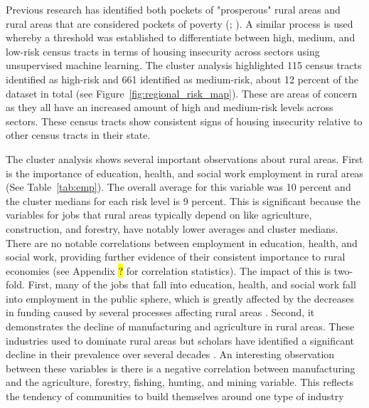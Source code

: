 Previous research has identified both pockets of "prosperous" rural areas and rural areas that are considered pockets of poverty (\citealp{isserman_why_2009}; \citealp{miller_persistent_2003}). A similar process is used whereby a threshold was established to differentiate between high, medium, and low-risk census tracts in terms of housing insecurity across sectors using unsupervised machine learning. The cluster analysis highlighted 115 census tracts identified as high-risk and 661 identified as medium-risk, about 12 percent of the dataset in total (see Figure~\ref{fig:regional_risk_map}). These are areas of concern as they all have an increased amount of high and medium-risk levels across sectors. These census tracts show consistent signs of housing insecurity relative to other census tracts in their state. 

 The cluster analysis shows several important observations about rural areas. First is the importance of education, health, and social work employment in rural areas (See Table~\ref{tab:emp}). The overall average for this variable was 10 percent and the cluster medians for each risk level is 9 percent. This is significant because the variables for jobs that rural areas typically depend on like agriculture, construction, and forestry, have notably lower averages and cluster medians. There are no notable correlations between employment in education, health, and social work, providing further evidence of their consistent importance to rural economies (see Appendix \hl{?} for correlation statistics). The impact of this is two-fold. First, many of the jobs that fall into education, health, and social work fall into employment in the public sphere, which is greatly affected by the decreases in funding caused by several processes affecting rural areas \citep{blank_poverty_2005}. Second, it demonstrates the decline of manufacturing and agriculture in rural areas. These industries used to dominate rural areas but scholars have identified a significant decline in their prevalence over several decades \citep{robertson_rural_2007}. An interesting observation between these variables is there is a negative correlation between manufacturing and the agriculture, forestry, fishing, hunting, and mining variable. This reflects the tendency of communities to build themselves around one type of industry 
 
